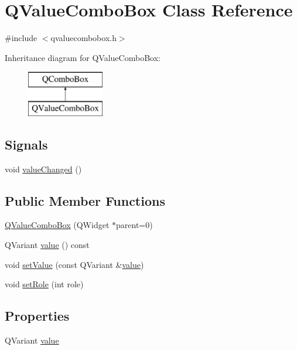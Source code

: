 \hypertarget{class_q_value_combo_box}{}\section{Q\+Value\+Combo\+Box Class Reference}
\label{class_q_value_combo_box}


{\ttfamily \#include $<$qvaluecombobox.\+h$>$}

Inheritance diagram for Q\+Value\+Combo\+Box\+:\begin{figure}[H]
\begin{center}
\leavevmode
\includegraphics[height=2.000000cm]{class_q_value_combo_box}
\end{center}
\end{figure}
\subsection*{Signals}
\begin{DoxyCompactItemize}
\item 
void \hyperlink{class_q_value_combo_box_a0b8f087567544541949baaad9e0626ed}{value\+Changed} ()
\end{DoxyCompactItemize}
\subsection*{Public Member Functions}
\begin{DoxyCompactItemize}
\item 
\hyperlink{class_q_value_combo_box_a7b0b30b9a341440940825a1655dc36dc}{Q\+Value\+Combo\+Box} (Q\+Widget $\ast$parent=0)
\item 
Q\+Variant \hyperlink{class_q_value_combo_box_acc36cf7b65d22fccc52314929cb74303}{value} () const 
\item 
void \hyperlink{class_q_value_combo_box_af192c68c0c82f33000d8c1be8c013d2d}{set\+Value} (const Q\+Variant \&\hyperlink{class_q_value_combo_box_ac487ee6027e1b8b7c211f95d60c45f7c}{value})
\item 
void \hyperlink{class_q_value_combo_box_a9db5bc48951130e1104322de54f55471}{set\+Role} (int role)
\end{DoxyCompactItemize}
\subsection*{Properties}
\begin{DoxyCompactItemize}
\item 
Q\+Variant \hyperlink{class_q_value_combo_box_ac487ee6027e1b8b7c211f95d60c45f7c}{value}
\end{DoxyCompactItemize}


